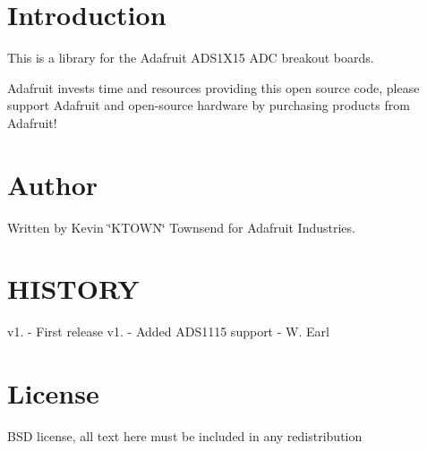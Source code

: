 \hypertarget{index_intro_sec}{}\section{Introduction}\label{index_intro_sec}
This is a library for the Adafruit A\+D\+S1\+X15 A\+DC breakout boards.

Adafruit invests time and resources providing this open source code, please support Adafruit and open-\/source hardware by purchasing products from Adafruit!\hypertarget{index_author}{}\section{Author}\label{index_author}
Written by Kevin \char`\"{}\+K\+T\+O\+W\+N\char`\"{} Townsend for Adafruit Industries.\hypertarget{index_HISTORY}{}\section{H\+I\+S\+T\+O\+RY}\label{index_HISTORY}
v1. -\/ First release v1. -\/ Added A\+D\+S1115 support -\/ W. Earl\hypertarget{index_license}{}\section{License}\label{index_license}
B\+SD license, all text here must be included in any redistribution 